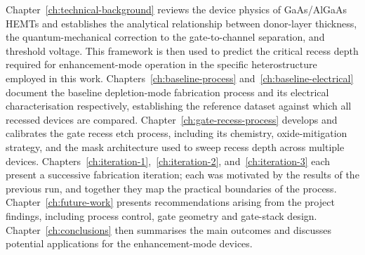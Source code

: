 Chapter~\ref{ch:technical-background} reviews the device physics of GaAs/AlGaAs HEMTs
and establishes the analytical relationship between donor-layer thickness,
the quantum-mechanical correction to the gate-to-channel separation, and
threshold voltage. This framework is then used to predict the critical
recess depth required for enhancement-mode operation in the specific
heterostructure employed in this work. Chapters~\ref{ch:baseline-process}
and~\ref{ch:baseline-electrical} document the baseline depletion-mode fabrication
process and its electrical characterisation respectively, establishing the
reference dataset against which all recessed devices are compared.
Chapter~\ref{ch:gate-recess-process} develops and calibrates the gate recess
etch process, including its chemistry, oxide-mitigation strategy, and the
mask architecture used to sweep recess depth across multiple devices.
Chapters~\ref{ch:iteration-1},~\ref{ch:iteration-2}, and~\ref{ch:iteration-3} each present a
successive fabrication iteration; each was motivated by the results of the
previous run, and together they map the practical boundaries of the process.
Chapter~\ref{ch:future-work} presents recommendations arising from the project
findings, including process control, gate geometry and gate-stack design.
Chapter~\ref{ch:conclusions} then summarises the main outcomes and discusses
potential applications for the enhancement-mode devices.
